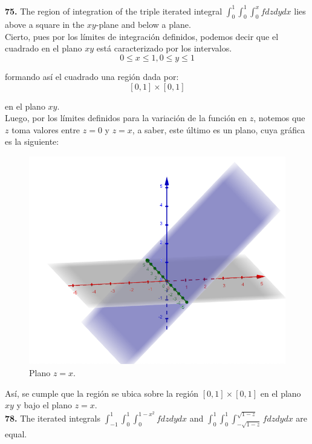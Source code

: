 \documentclass[11pt]{report}
\begin{document}
\textbf{75.} The region of integration of the triple iterated integral
$\int_0^1 \int_0^1 \int_0^x f dz dy dx $ lies above a square in the $xy$-plane
and below a plane. \\

Cierto, pues por los límites de integración definidos, podemos decir que el
cuadrado en el plano $xy$ está caracterizado por los intervalos.
	$$ 0 \leq x \leq 1, 0 \leq y \leq 1 $$

formando así el cuadrado una región dada por:
	$$ [0,1] \times [0,1] $$

en el plano $xy$.\\

Luego, por los límites definidos para la variación de la función en $z$, notemos
que $z$ toma valores entre $z = 0$ y $z = x$, a saber, este último es un plano,
cuya gráfica es la siguiente:

\begin{figure}[H]
	\includegraphics[scale=0.3]{plane.png}
	\centering
	\caption{Plano $z = x$.}
	\centering
\end{figure}

Así, se cumple que la región se ubica sobre la región $[0,1] \times [0,1]$ en el
plano $xy$ y bajo el plano $z = x$.\\

\textbf{78.} The iterated integrals $\int_{-1}^1 \int_0^1 \int_0^{1-x^2} f dz dy dx $
and $\int_0^1 \int_0^1 \int_{-\sqrt{1-z}}^{\sqrt{1-z}} f dz dy dx $ are equal. \\
\end{document}
